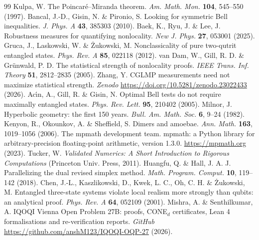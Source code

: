 \begin{thebibliography}{99}
 Kulpa, W. The Poincar\'{e}--Miranda theorem. \textit{Am. Math. Mon.} \textbf{104}, 545--550 (1997).
 Bancal, J.-D., Gisin, N. \& Pironio, S. Looking for symmetric Bell inequalities. \textit{J. Phys. A} \textbf{43}, 385303 (2010).
 Baek, K., Ryu, J. \& Lee, J. Robustness measures for quantifying nonlocality. \textit{New J. Phys.} \textbf{27}, 053001 (2025).
 Gruca, J., Laskowski, W. \& \.{Z}ukowski, M. Nonclassicality of pure two-qutrit entangled states. \textit{Phys. Rev. A} \textbf{85}, 022118 (2012).
 van Dam, W., Gill, R. D. \& Gr\"{u}nwald, P. D. The statistical strength of nonlocality proofs. \textit{IEEE Trans. Inf. Theory} \textbf{51}, 2812--2835 (2005).
 Zhang, Y. CGLMP measurements need not maximize statistical strength. \textit{Zenodo} \url{https://doi.org/10.5281/zenodo.23022433} (2026).
 Ac\'{\i}n, A., Gill, R. \& Gisin, N. Optimal Bell tests do not require maximally entangled states. \textit{Phys. Rev. Lett.} \textbf{95}, 210402 (2005).
 Milnor, J. Hyperbolic geometry: the first 150 years. \textit{Bull. Am. Math. Soc.} \textbf{6}, 9--24 (1982).
 Kenyon, R., Okounkov, A. \& Sheffield, S. Dimers and amoebae. \textit{Ann. Math.} \textbf{163}, 1019--1056 (2006).
 The mpmath development team. mpmath: a Python library for arbitrary-precision floating-point arithmetic, version 1.3.0. \url{https://mpmath.org} (2023).
 Tucker, W. \textit{Validated Numerics: A Short Introduction to Rigorous Computations} (Princeton Univ. Press, 2011).
 Huangfu, Q. \& Hall, J. A. J. Parallelizing the dual revised simplex method. \textit{Math. Program. Comput.} \textbf{10}, 119--142 (2018).
 Chen, J.-L., Kaszlikowski, D., Kwek, L. C., Oh, C. H. \& \.{Z}ukowski, M. Entangled three-state systems violate local realism more strongly than qubits: an analytical proof. \textit{Phys. Rev. A} \textbf{64}, 052109 (2001).
 Mishra, A. \& Senthilkumar, A. IQOQI Vienna Open Problem 27B: proofs, CONE$_d$ certificates, Lean 4 formalisations and re-verification reports. \textit{GitHub} \url{https://github.com/anshM123/IQOQI-OQP-27} (2026).
\end{thebibliography}
